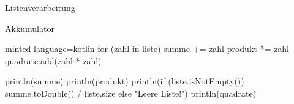 \begin{task}[points=auto]{Listenverarbeitung}
\begin{subtask*}[points=0]{Akkumulator }
\begin{solution}
\begin{codeBlock}[]{minted language=kotlin}
                for (zahl in liste) {
                    summe += zahl
                    produkt *= zahl
                    quadrate.add(zahl * zahl)
                }

                println(summe)
                println(produkt)
                println(if (liste.isNotEmpty()) summe.toDouble() / liste.size else "Leere Liste!")
                println(quadrate)
            \end{codeBlock}
        \end{solution}
    \end{subtask*}
\end{task}

